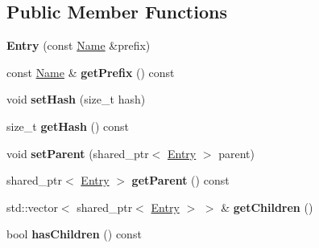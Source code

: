 \subsection*{Public Member Functions}
\begin{DoxyCompactItemize}
\item 
{\bfseries Entry} (const \hyperlink{classndn_1_1Name}{Name} \&prefix)\hypertarget{classnfd_1_1name__tree_1_1Entry_a19e17e184ace883bf290c583d1ccbe81}{}\label{classnfd_1_1name__tree_1_1Entry_a19e17e184ace883bf290c583d1ccbe81}

\item 
const \hyperlink{classndn_1_1Name}{Name} \& {\bfseries get\+Prefix} () const\hypertarget{classnfd_1_1name__tree_1_1Entry_aec415012f232e832b66e19297f9681d4}{}\label{classnfd_1_1name__tree_1_1Entry_aec415012f232e832b66e19297f9681d4}

\item 
void {\bfseries set\+Hash} (size\+\_\+t hash)\hypertarget{classnfd_1_1name__tree_1_1Entry_a614d13bac9dc8ec1ccf73986a40904b5}{}\label{classnfd_1_1name__tree_1_1Entry_a614d13bac9dc8ec1ccf73986a40904b5}

\item 
size\+\_\+t {\bfseries get\+Hash} () const\hypertarget{classnfd_1_1name__tree_1_1Entry_aa5012ab97d6cd5eba6fb9eaded6b7554}{}\label{classnfd_1_1name__tree_1_1Entry_aa5012ab97d6cd5eba6fb9eaded6b7554}

\item 
void {\bfseries set\+Parent} (shared\+\_\+ptr$<$ \hyperlink{classnfd_1_1name__tree_1_1Entry}{Entry} $>$ parent)\hypertarget{classnfd_1_1name__tree_1_1Entry_ae371cc233d7896e8d30fdcb50a8c205a}{}\label{classnfd_1_1name__tree_1_1Entry_ae371cc233d7896e8d30fdcb50a8c205a}

\item 
shared\+\_\+ptr$<$ \hyperlink{classnfd_1_1name__tree_1_1Entry}{Entry} $>$ {\bfseries get\+Parent} () const\hypertarget{classnfd_1_1name__tree_1_1Entry_ab887889178de1a3ddd04fe7418473128}{}\label{classnfd_1_1name__tree_1_1Entry_ab887889178de1a3ddd04fe7418473128}

\item 
std\+::vector$<$ shared\+\_\+ptr$<$ \hyperlink{classnfd_1_1name__tree_1_1Entry}{Entry} $>$ $>$ \& {\bfseries get\+Children} ()\hypertarget{classnfd_1_1name__tree_1_1Entry_aa4f8198cb3d8aacbe18f11f6979f6d5f}{}\label{classnfd_1_1name__tree_1_1Entry_aa4f8198cb3d8aacbe18f11f6979f6d5f}

\item 
bool {\bfseries has\+Children} () const\hypertarget{classnfd_1_1name__tree_1_1Entry_add7d7c34da4743a15d61cba8baa5bd27}{}\label{classnfd_1_1name__tree_1_1Entry_add7d7c34da4743a15d61cba8baa5bd27}


\end{DoxyCompactItemize}
